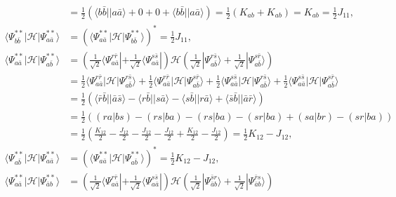 \documentclass[a4paper]{book}
\newcounter{solution}[chapter]
\begin{document}
\begin{solution}
\begin{itemize}
\begin{align*}
		&= \frac{1}{2} \left( \langle b \bar{b} || a \bar{a} \rangle + 0 + 0 + \langle b \bar{b} || a \bar{a} \rangle \right) = \frac{1}{2} \left( K_{ab} + K_{ab} \right) = K_{ab} = \frac{1}{2} J_{11}, \\
		\langle \Psi^{**}_{b\bar{b}}| \mathscr{H} | \Psi^{**}_{a\bar{a}} \rangle &= ( \langle \Psi^{**}_{a\bar{a}} | \mathscr{H} | \Psi^{**}_{b\bar{b}} \rangle )^* =  \frac{1}{2} J_{11}, \\
		\langle \Psi^{**}_{a\bar{a}} | \mathscr{H} | \Psi^{**}_{a\bar{b}} \rangle &= \left( \frac{1}{ \sqrt{2} } \langle \Psi^{ r \bar{r} }_{a \bar{a}} | + \frac{1}{ \sqrt{2} } \langle \Psi^{ s \bar{s} }_{a \bar{a}} | \right) \mathscr{H} \left( \frac{1}{ \sqrt{2} } | \Psi^{ r \bar{s} }_{a \bar{b}} \rangle + \frac{1}{ \sqrt{2} } | \Psi^{ s \bar{r} }_{a \bar{b}} \rangle \right) \\
		&= \frac{1}{2} \langle \Psi^{ r \bar{r} }_{a \bar{a}} | \mathscr{H} | \Psi^{ r \bar{s} }_{a \bar{b}} \rangle + \frac{1}{2} \langle \Psi^{ r \bar{r} }_{a \bar{a}} | \mathscr{H} | \Psi^{ s \bar{r} }_{a \bar{b}} \rangle + \frac{1}{2} \langle \Psi^{ s \bar{s} }_{a \bar{a}} | \mathscr{H} | \Psi^{ r \bar{s} }_{a \bar{b}} \rangle + \frac{1}{2} \langle \Psi^{ s \bar{s} }_{a \bar{a}} | \mathscr{H} | \Psi^{ s \bar{r} }_{a \bar{b}} \rangle \\
		&= \frac{1}{2} \left( \langle \bar{r} \bar{b} || \bar{a} \bar{s} \rangle - \langle r \bar{b} || s \bar{a} \rangle - \langle s \bar{b} || r \bar{a} \rangle + \langle \bar{s} \bar{b} || \bar{a} \bar{r} \rangle \right) \\
		&= \frac{1}{2} \left( (ra|bs) - (rs|ba) - (rs|ba) - (sr|ba) + (sa|br) - (sr|ba) \right) \\
		&= \frac{1}{2} \left( \frac{ K_{12} }{2} - \frac{ J_{12} }{2} - \frac{ J_{12} }{2} - \frac{ J_{12} }{2} + \frac{ K_{12} }{2} - \frac{ J_{12} }{2} \right) = \frac{1}{2} K_{12} - J_{12}, \\
		\langle \Psi^{**}_{a\bar{b}} | \mathscr{H} | \Psi^{**}_{a\bar{a}} \rangle &= ( \langle \Psi^{**}_{a\bar{a}} | \mathscr{H} | \Psi^{**}_{a\bar{b}} \rangle )^* = \frac{1}{2} K_{12} - J_{12}, \\
		\langle \Psi^{**}_{a\bar{a}} | \mathscr{H} | \Psi^{**}_{\bar{a} b} \rangle &= \left( \frac{1}{ \sqrt{2} } \langle \Psi^{ r \bar{r} }_{a \bar{a}} | + \frac{1}{ \sqrt{2} } \langle \Psi^{ s \bar{s} }_{a \bar{a}} | \right) \mathscr{H} \left( \frac{1}{ \sqrt{2} } | \Psi^{ \bar{s} r }_{\bar{a} b} \rangle + \frac{1}{ \sqrt{2} } | \Psi^{ \bar{r} s }_{\bar{a} b} \rangle \right) \\

\end{align*}
\end{itemize}
\end{solution}
\end{document}
